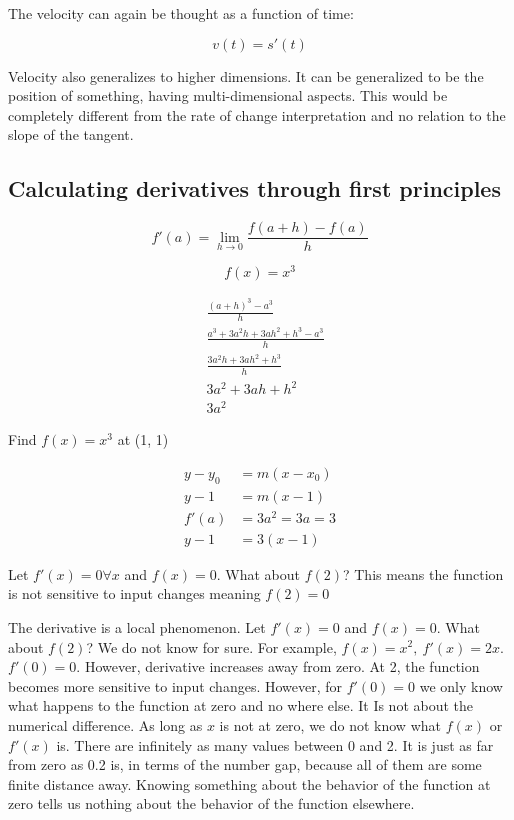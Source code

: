 \documentclass[
]{article}
\newcounter{example}
\begin{document}
The velocity can again be thought as a function of time:

$$v(t) = s'(t)$$

Velocity also generalizes to higher dimensions. It can be generalized to
be the position of something, having multi-dimensional aspects. This
would be completely different from the rate of change interpretation and
no relation to the slope of the tangent.


\subsection{Calculating derivatives through first
principles}

$$f'(a) = \lim_{h \rightarrow 0}\frac{f(a + h) - f(a)}{h}$$

$$f(x) = x^{3}$$

\begin{align*}
&\frac{(a + h)^{3} - a^{3}}{h}
 \\
&\frac{a^{3} + 3a^{2}h + 3ah^{2} + h^{3} - a^{3}}{h}
 \\
&\frac{3a^{2}h + 3ah^{2} + h^{3}}{h}
 \\
&3a^{2} + 3ah + h^{2}
 \\
&3a^{2}
\end{align*}


Find $f(x) = x^{3}$ at (1, 1)

\begin{align*}
y - y_{0} &= m\left( x - x_{0} \right)
 \\
y - 1 &= m(x - 1)
 \\
f'(a) &= 3a^{2} = 3a = 3
 \\
y - 1 &= 3(x - 1)
\end{align*}


Let $f'(x) = 0\forall x$ and $f(x) = 0$. What about $f(2)$?
This means the function is not sensitive to input changes meaning
$f(2) = 0$

The derivative is a local phenomenon. Let $f'(x) = 0$ and
$f(x) = 0$. What about $f(2)$? We do not know for sure. For example,
$f(x) = x^{2},\ f'(x) = 2x$. $f'(0) = 0$. However, derivative
increases away from zero. At 2, the function becomes more sensitive to
input changes. However, for $f'(0) = 0$ we only know what happens
to the function at zero and no where else. It Is not about the numerical
difference. As long as $x$ is not at zero, we do not know what
$f(x)$ or $f'(x)$ is. There are infinitely as many values between 0
and 2. It is just as far from zero as 0.2 is, in terms of the number
gap, because all of them are some finite distance away. Knowing
something about the behavior of the function at zero tells us nothing
about the behavior of the function elsewhere.
\end{document}

